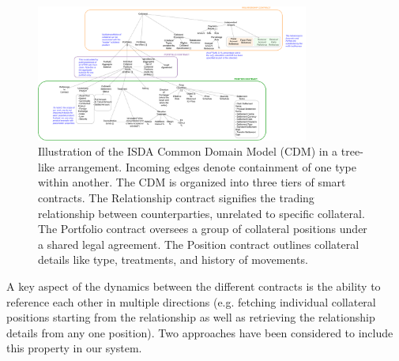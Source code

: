 \thispagestyle{empty}
\begin{figure}[!h]
    \centering
    \includegraphics[angle=90, width=0.8\textwidth]{images/chapter 3/mapping (for draft).drawio.pdf}
    \caption[Mapping Common Domain Model to Smart Contracts]{Illustration of the ISDA Common Domain Model (CDM) in a tree-like arrangement. Incoming edges denote containment of one type within another. The CDM is organized into three tiers of smart contracts. The Relationship contract signifies the trading relationship between counterparties, unrelated to specific collateral. The Portfolio contract oversees a group of collateral positions under a shared legal agreement. The Position contract outlines collateral details like type, treatments, and history of movements. }
    \label{fig:mapping}
\end{figure}
\restoregeometry

A key aspect of the dynamics between the different contracts is the ability to reference each other in multiple directions (e.g. fetching individual collateral positions starting from the relationship as well as retrieving the relationship details from any one position). Two approaches have been considered to include this property in our system.


